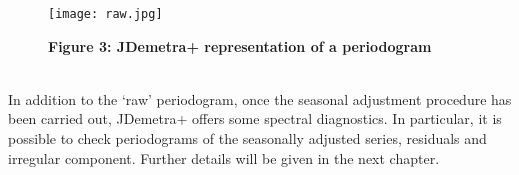 \documentclass{article}
\begin{document}
\begin{figure}[h!]
\texttt{[image: raw.jpg]}
\caption{\textbf{\small Figure 3: JDemetra+ representation of a periodogram}}
\end{figure}
\\In addition to the ‘raw’ periodogram, once the seasonal adjustment procedure has been carried out, JDemetra+ offers some spectral diagnostics. In particular, it is possible to check periodograms of the seasonally adjusted series, residuals and irregular component. Further details will be given in the next chapter.
\end{document}
